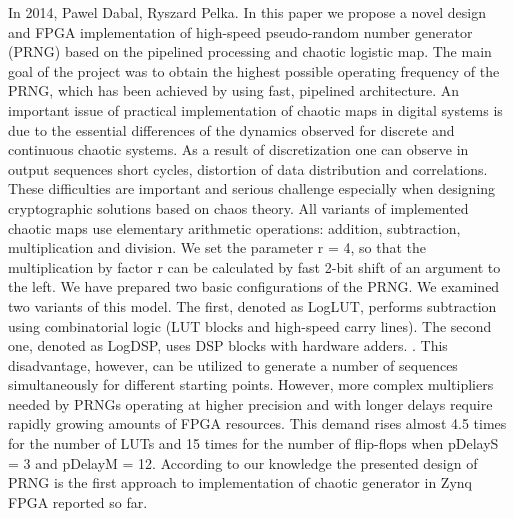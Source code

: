
In 2014, Pawel Dabal, Ryszard Pelka. In this paper we propose a novel design and FPGA implementation of high-speed pseudo-random number generator (PRNG) based on the pipelined processing and chaotic logistic map.  The main goal of the project was to obtain the highest possible operating frequency of the PRNG, which has been achieved by using fast, pipelined architecture. An important issue of practical implementation of chaotic maps in digital systems is due to the essential differences of the dynamics observed for discrete and continuous chaotic systems. As a result of discretization one can observe in output sequences short cycles, distortion of data distribution and correlations. These difficulties are important and serious challenge especially when designing cryptographic solutions based on chaos theory. All variants of implemented chaotic maps use elementary arithmetic operations: addition, subtraction, multiplication and division. We set the parameter r = 4, so that the multiplication by factor r can be calculated by fast 2-bit shift of an argument to the left. We have prepared two basic configurations of the PRNG. We examined two variants of this model. The first, denoted as LogLUT, performs subtraction using combinatorial logic (LUT blocks and high-speed carry lines). The second one, denoted as LogDSP, uses DSP blocks with hardware adders. . This disadvantage, however, can be utilized to generate a number of sequences simultaneously for different starting points. However, more complex multipliers needed by PRNGs operating at higher precision and with longer delays require rapidly growing amounts of FPGA resources. This demand rises almost 4.5 times for the number of LUTs and 15 times for the number of flip-flops when pDelayS = 3 and pDelayM = 12. According to our knowledge the presented design of PRNG is the first approach to implementation of chaotic generator in Zynq FPGA reported so far. 

